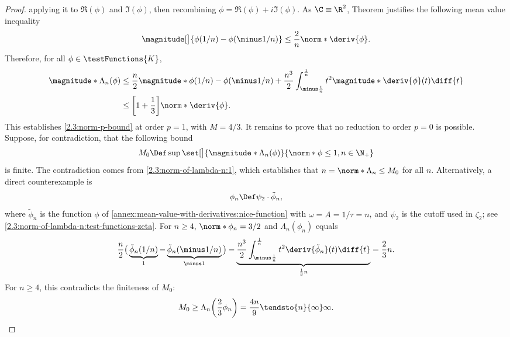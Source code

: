 \begin{proof}
applying it to $\Re(\phi)$ and $\Im(\phi)$, then recombining %
$\phi = \Re(\phi) + i\Im(\phi)$. As $\C \equiv \R^2$, Theorem  justifies the following mean value %
inequality
% 
\begin{equation}
  \magnitude[\big]{\phi(1/n)- \phi(\minus 1/n)} \leq \frac{2}{n} \norm*{\deriv{\phi}}.
\end{equation}
% 
Therefore, for all $\phi \in \testFunctions{K}$,
% 
\begin{align}
  \magnitude*{\Lambda_n(\phi)} & \leq \frac{n}{2}\magnitude*{\phi(1/n) - \phi(\minus 1/n)} %
    + \frac{n^3}{2} \int_{\minus \frac{1}{n}}^{\frac{1}{n}} t^2 \magnitude*{\deriv{\phi}(t)} \diff{t} \\
  & \leq \biggl[1 + \frac{1}{3}\biggr] \norm*{\deriv{\phi}}. \label{2.3:upper-bound}
\end{align}
% 
This establishes \eqref{2.3:norm-p-bound} at order $p=1$, with $M = 4/3$. It remains to prove that no reduction to order %
$p=0$ is possible. Suppose, for contradiction, that the following bound
% 
\begin{equation}
  M_0 \Def \sup\set[\big]{
    \magnitude*{\Lambda_n(\phi)}}{
    \norm*{\phi} \leq 1, n \in \N_+
  }
\end{equation}
% 
is finite. The contradiction comes from \eqref{2.3:norm-of-lambda-n:1}, which establishes that %
$n = \norm*{\Lambda_n} \leq M_0$ for all $n$. Alternatively, a direct counterexample is %
% 
\begin{equation}\label{2.3:phi-n-definition}
  \phi_n \Def \psi_2 \cdot \tilde{\phi}_n,
\end{equation}
% 
where $\tilde{\phi}_n$ is the function $\phi$ of \eqref{annex:mean-value-with-derivatives:nice-function} %
with $\omega = A = 1/\tau = n$, and $\psi_2$ is the cutoff used in $\zeta_2$; see %
\eqref{2.3:norm-of-lambda-n:test-functions-zeta}. For $n \geq 4$, $\norm*{\phi_n} = 3/2$ and $\Lambda_n (\phi_n)$ equals 
% 
\begin{equation} 
  \frac{n}{2} \bigl(\,\underbrace{\tilde{\phi}_n(1/n)}_{1} 
  - \underbrace{\tilde{\phi}_n(\minus 1 /n)}_{\minus 1}\,\bigr) 
  - \underbrace{\frac{n^3}{2} \int_{\minus \frac{1}{n}}^{\frac{1}{n}} t^2 \deriv{\tilde{\phi}_n}(t) \diff{t}}_{\frac{1}{3}n} %
  = \frac{2}{3}n.
\end{equation}
% 
For $n \geq 4$, this contradicts the finiteness of $M_0$:
%
\begin{equation}\label{2.3:upper-bound-contradiction}
  M_0 \geq \Lambda_n\biggl(\frac{2}{3}\phi_n\biggr) = \frac{4n}{9} \tendsto{n}{\infty}\infty. 

\end{equation}
\end{proof}
